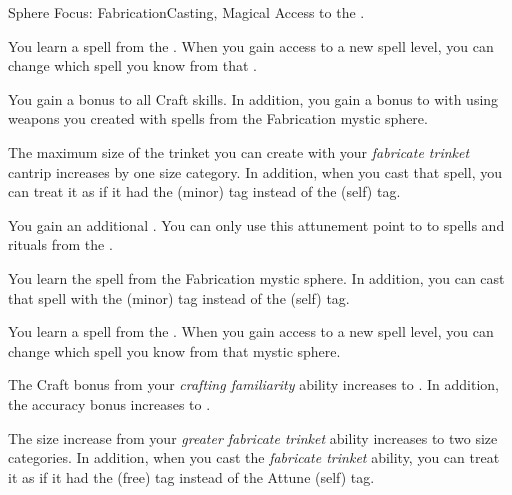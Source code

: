     \begin{feat}{Sphere Focus: Fabrication}{Casting, Magical}
        \featpre Access to the  .

         You learn a spell from the  .
        When you gain access to a new spell level, you can change which spell you know from that .

         You gain a  bonus to all Craft skills.
        In addition, you gain a  bonus to  with  using weapons you created with spells from the Fabrication mystic sphere.

         The maximum size of the trinket you can create with your \textit{fabricate trinket} cantrip increases by one size category.
        In addition, when you cast that spell, you can treat it as if it had the  (minor) tag instead of the  (self) tag.

         You gain an additional .
        You can only use this attunement point to  to spells and rituals from the  .

         You learn the  spell from the Fabrication mystic sphere.
        In addition, you can cast that spell with the  (minor) tag instead of the  (self) tag.

         You learn a spell from the  .
        When you gain access to a new spell level, you can change which spell you know from that mystic sphere.

         The Craft bonus from your \textit{crafting familiarity} ability increases to .
        In addition, the accuracy bonus increases to .

         The size increase from your \textit{greater fabricate trinket} ability increases to two size categories.
        In addition, when you cast the \textit{fabricate trinket} ability, you can treat it as if it had the  (free) tag instead of the Attune (self) tag.
    \end{feat}

